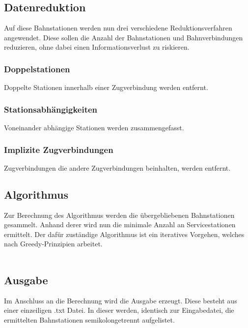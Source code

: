 \subsection{Datenreduktion}\label{subsubsec:datenreduktion}
Auf diese Bahnstationen werden nun drei verschiedene Reduktionsverfahren angewendet. Diese sollen die Anzahl der Bahnstationen und Bahnverbindungen reduzieren, ohne dabei einen Informationsverlust zu riskieren.\\ 

\subsubsection{Doppelstationen}\label{subsubsec:doppelstationen}
Doppelte Stationen innerhalb einer Zugverbindung werden entfernt.

\subsubsection{Stationsabhängigkeiten}\label{subsubsec:stationsabhaengigkeiten}
Voneinander abhängige Stationen werden zusammengefasst.

\subsubsection{Implizite Zugverbindungen}\label{subsubsec:implizite-zugverbindungen}
Zugverbindungen die andere Zugverbindungen beinhalten, werden entfernt.
\\
\subsection{Algorithmus}\label{subsec:algorithmus}
Zur Berechnung des Algorithmus werden die übergebliebenen Bahnstationen gesammelt. Anhand derer wird nun die minimale Anzahl an Servicestationen ermittelt. Der dafür zuständige Algorithmus ist ein iteratives Vorgehen, welches nach Greedy-Prinzipien arbeitet.\\
\\
\subsection{Ausgabe}\label{subsec:ausgabe}
Im Anschluss an die Berechnung wird die Ausgabe erzeugt. Diese besteht aus einer einzeiligen .txt Datei. In dieser werden, identisch zur Eingabedatei, die ermittelten Bahnstationen semikolongetrennt aufgelistet.\\

